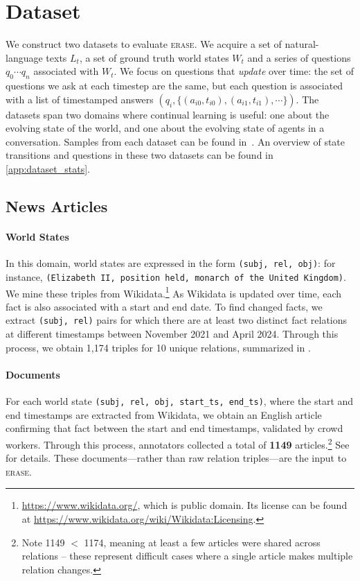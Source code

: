 \documentclass[11pt]{article}
\newcommand{\ourmethod}{\textsc{erase}\xspace}
\begin{document}
\section{Dataset}
\label{s:dataset}



We construct two datasets to evaluate \ourmethod.
We acquire a set of natural-language texts $L_t$, a set of ground truth world states $W_t$ and a series of questions $q_0\cdots q_n$ associated with $W_t$.
We focus on questions that \textit{update} over time: the set of questions we ask at each timestep are the same, but each question is associated with a list of timestamped answers $(q_i, \{(a_{i0}, t_{i0}), (a_{i1}, t_{i1}),\cdots\})$. %
The datasets span two domains where continual learning is useful: one about the evolving state of the world, and one about the evolving state of agents in a conversation. Samples from each dataset can be found in~. An overview of state transitions and questions in these two datasets can be found in \autoref{app:dataset_stats}.



\subsection{News Articles}


\paragraph{World States}
In this domain, world states are expressed in the form \texttt{(subj, rel, obj)}: for instance, \texttt{(Elizabeth II, position held, monarch of the United Kingdom)}. We mine these triples from Wikidata.\footnote{\url{https://www.wikidata.org/}, which is public domain. Its license can be found at \url{https://www.wikidata.org/wiki/Wikidata:Licensing}.} As Wikidata is updated over time, each fact is also associated with a start and end date. To find changed facts, we extract \texttt{(subj, rel)} pairs for which there are at least two distinct fact relations at different timestamps between November 2021 and April 2024. Through this process, we obtain 1,174 triples for 10 unique relations, summarized in .

\paragraph{Documents}
For each world state \texttt{(subj, rel, obj, start\_ts, end\_ts)}, where the start and end timestamps are extracted from Wikidata, we obtain an English article confirming that fact between the start and end timestamps, validated by crowd workers. Through this process, annotators collected a total of \textbf{1149} articles.\footnote{Note 1149 $<$ 1174, meaning at least a few articles were shared across relations -- these represent difficult cases where a single article makes multiple relation changes.} See  for details. These documents---rather than raw relation triples---are the input to \ourmethod.
\end{document}
